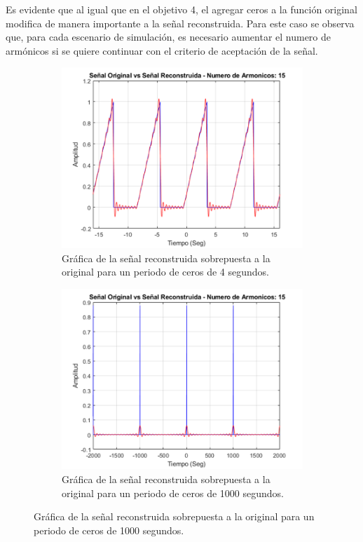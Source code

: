 \documentclass[7pt]{article}
\begin{document}
    Es evidente que al igual que en el objetivo 4, el agregar ceros a la función original modifica 
    de manera importante a la señal reconstruida. Para este caso se observa que, para cada 
    escenario de simulación, es necesario aumentar el numero de armónicos si se quiere 
    continuar con el criterio de aceptación de la señal.

    \begin{figure}[H]
        \centering 
        \begin{subfigure}[h]{0.45\linewidth}
            \includegraphics[width=\linewidth]{img/figure8_A.png}
            \caption{Gráfica de la señal reconstruida sobrepuesta a la original para un periodo de ceros de 4 segundos.}
            \label{figure8_A}
        \end{subfigure}
        \begin{subfigure}[h]{0.45\linewidth}
            \includegraphics[width=\linewidth]{img/figure8_B.png}
            \caption{Gráfica de la señal reconstruida sobrepuesta a la original para un periodo de ceros de 1000 segundos.}
            \label{figure8_B}
        \end{subfigure}
        \label{figure8}
    \end{figure}
\end{document}
